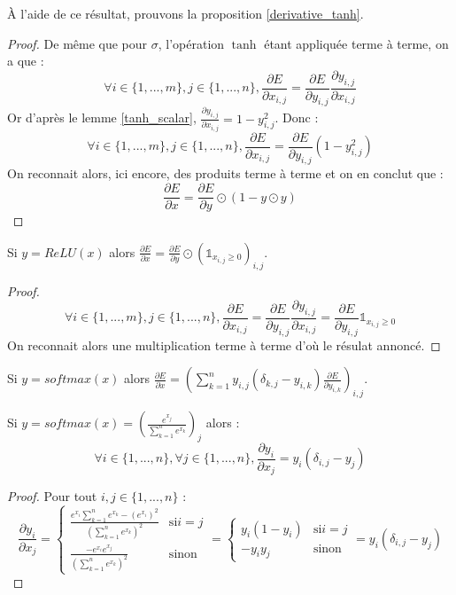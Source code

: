 À l'aide de ce résultat, prouvons la proposition \ref{derivative_tanh}.

\begin{proof}
De même que pour $\sigma$, l'opération $\tanh$ étant appliquée terme à terme, on a que :
$$
\forall i \in \{1, ..., m\}, j \in \{1, ..., n\}, \frac{\partial E}{\partial x_{i, j}} = \frac{\partial E}{\partial y_{i, j}}\frac{\partial y_{i, j}}{\partial x_{i, j}}
$$
Or d'après le lemme \ref{tanh_scalar}, $\frac{\partial y_{i, j}}{\partial x_{i, j}} = 1 - y_{i, j}^2$. Donc :
$$
\forall i \in \{1, ..., m\}, j \in \{1, ..., n\}, \frac{\partial E}{\partial x_{i, j}} = \frac{\partial E}{\partial y_{i, j}}(1 - y_{i, j}^2)
$$
On reconnait alors, ici encore, des produits terme à terme et on en conclut que :
$$
\frac{\partial E}{\partial x} = \frac{\partial E}{\partial y} \odot (1 - y \odot y)
$$
\end{proof}

\begin{proposition}
Si $y = ReLU(x)$ alors $\frac{\partial E}{\partial x} = \frac{\partial E}{\partial y} \odot (\mathds{1}_{x_{i,j} \geq 0})_{i,j}$.
\end{proposition}

\begin{proof}
$$
\forall i \in \{1, ..., m\}, j \in \{1, ..., n\}, \frac{\partial E}{\partial x_{i, j}} = \frac{\partial E}{\partial y_{i, j}}\frac{\partial y_{i, j}}{\partial x_{i, j}} = \frac{\partial E}{\partial y_{i, j}}\mathds{1}_{x_{i,j} \geq 0}
$$
On reconnait alors une multiplication terme à terme d'où le résulat annoncé.
\end{proof}

\begin{proposition}
Si $y = softmax(x)$ alors $\frac{\partial E}{\partial x} = \left(\sum_{k = 1}^{n}{y_{i,j}(\delta_{k,j} - y_{i,k})\frac{\partial E}{\partial y_{i, k}}}\right)_{i,j}$.
\label{derivative_softmax}
\end{proposition}

\begin{lemma}
Si $y = softmax(x) = \left(\frac{e^{x_j}}{\sum_{k = 1}^{n}{e^{x_k}}}\right)_j$ alors :
$$
\forall i \in \{1, ..., n\}, \forall j \in \{1, ..., n\}, \frac{\partial y_i}{\partial x_j} = y_i(\delta_{i, j} - y_j)
$$
\end{lemma}

\begin{proof}
Pour tout $i, j \in \{1, ..., n\}$ :
$$
\frac{\partial y_i}{\partial x_j} = 
\left\{
\begin{array}{rl}
	\frac{e^{x_i}\sum_{k = 1}^{n}{e^{x_k}} - (e^{x_i})^2}{(\sum_{k = 1}^{n}{e^{x_k}})^2} & \text{si} i = j \\
	\frac{-e^{x_i}e^{x_j}}{(\sum_{k = 1}^{n}{e^{x_k}})^2} & \text{sinon}
\end{array}
\right.
=
\left\{
\begin{array}{rl}
	y_i(1 - y_i) & \text{si} i = j \\
	-y_iy_j & \text{sinon}
\end{array}
\right.
=
y_i(\delta_{i, j} - y_j)
$$
\end{proof}

